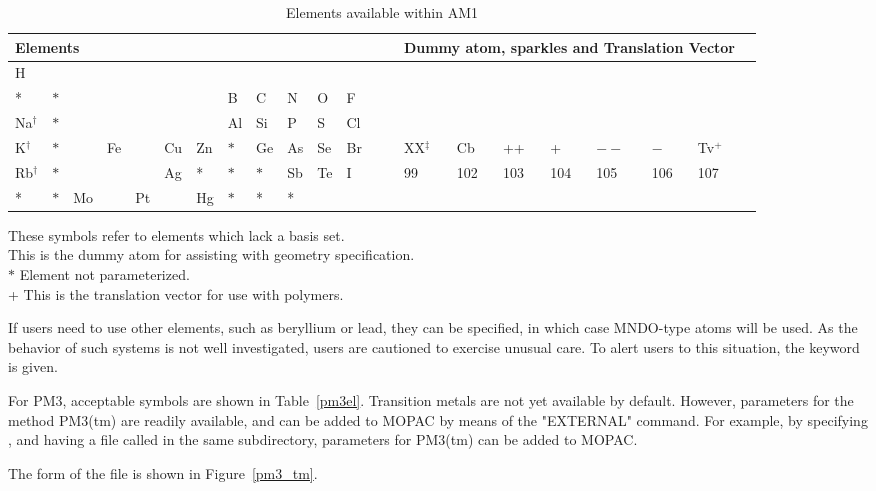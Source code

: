 \begin{table}
\begin{center}
\caption{\label{am1el} Elements available within AM1}
 \hspace*{-1.3in} \compresstable
\begin{tabular}{llllllllllllllllllllll}
\multicolumn{10}{l}{Elements}&&&&&\multicolumn{7}{l}{Dummy atom,
sparkles and
 Translation Vector} \\
\hline
  H  \\
   * &$*$&    & && &  & B& C& N& O& F           \\
  Na$^{\dag}$&$*$ && & &  &   &Al&Si& P& S&Cl &&&       &
\\
   K$^{\dag}$&$*$&&Fe& &Cu& Zn&$ *$&Ge&As&Se&Br &&&     XX$^{\ddag}$& Cb& ++&  +& $--$&  $-$& Tv$^+$  \\
 Rb$^{\dag}$&$*$& && & Ag&  *&$ *$&$*$&Sb&Te& I &&&     99&102&103&104&105&106&107  \\
  *  &$*$& Mo& &Pt& & Hg&$ *$&* & *&   \\
\hline
\end{tabular}
\end{center}
\dag  These symbols refer to elements which lack a basis set.  \\
\ddag  This is the dummy atom for assisting with geometry specification.  \\
$*$  Element not parameterized.  \\
+  This is the translation vector for use with polymers.  \\
\end{table}

If users need to use other elements, such as beryllium or lead, they can  be
specified,  in  which case MNDO-type atoms will be used.  As the behavior of
such systems is not well investigated, users are cautioned to exercise
unusual  care.   To  alert users to this situation, the keyword 
is given.
\label{pm3tm}

 
For PM3, acceptable symbols are shown in Table~\ref{pm3el}.  Transition metals
are not yet available by default.  However, parameters for the method PM3(tm) are
readily available, and can be added to MOPAC by means of the "EXTERNAL" command.
For example, by specifying , and having a file called
 in the same subdirectory, parameters for PM3(tm) can be added to MOPAC.

The form of the file  is shown in Figure~\ref{pm3_tm}.

